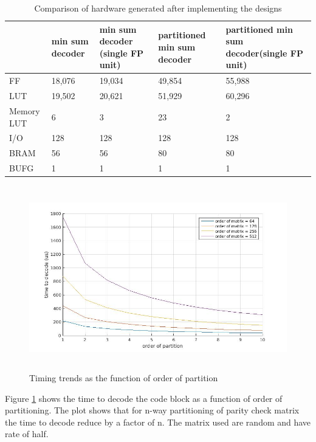 \begin{table}[H]
\centering
\caption[Comparison of  hardware generated after implementing the designs]{ Comparison of  hardware generated after implementing the designs }
\begin{tabular}{|p{1.3cm}|p{3.5cm}|p{3.5cm}|p{3.5cm}|p{3.5cm}|}
\hline
	& min sum decoder & min sum decoder \newline
	(single FP unit) & partitioned min sum decoder & partitioned min sum decoder(single FP unit) \\ \hline
FF & 18,076		&19,034		&49,854		&55,988 \\ \hline
LUT & 19,502  &20,621 &  51,929 & 60,296 \\ \hline
Memory LUT & 6 & 3 & 23 & 2 \\ \hline 
I/O & 128 & 128 & 128 & 128 \\ \hline
BRAM & 56 & 56 & 80 & 80 \\ \hline
BUFG  & 1 & 1 & 1 & 1 \\ \hline
\end{tabular}
\label{result_hw}
\end{table}

 \begin{figure}[h]
 \begin{center}
    \includegraphics[height=8cm,width=12cm]{untitled.jpg}
    \caption{Timing trends as the function of order of partition} 
    \label{untitled}
 \end{center}
\end{figure}

Figure \ref{untitled} shows the time to decode the code block as a function of order of partitioning. The plot shows that for n-way partitioning of parity check matrix the time to decode reduce by a factor of n. The matrix used are random and have rate of half.


